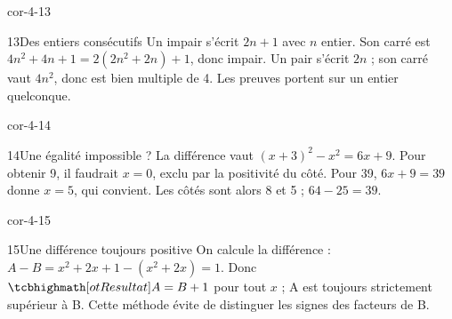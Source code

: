 \begin{blocLivre}{cor-4-13}\begin{corrige}{13}{Des entiers consécutifs}
Un impair s’écrit $2n+1$ avec $n$ entier. Son carré est $4n^2+4n+1=2(2n^2+2n)+1$, donc impair. Un pair s’écrit $2n$ ; son carré vaut $4n^2$, donc est bien multiple de 4. Les preuves portent sur un entier quelconque.
\end{corrige}\end{blocLivre}
\begin{blocLivre}{cor-4-14}\begin{corrige}{14}{Une égalité impossible ?}
La différence vaut $(x+3)^2-x^2=6x+9$. Pour obtenir 9, il faudrait $x=0$, exclu par la positivité du côté. Pour 39, $6x+9=39$ donne $x=5$, qui convient. Les côtés sont alors 8 et 5 ; $64-25=39$.
\end{corrige}\end{blocLivre}
\begin{blocLivre}{cor-4-15}\begin{corrige}{15}{Une différence toujours positive}
On calcule la différence : $A-B=x^2+2x+1-(x^2+2x)=1$. Donc $\res{A=B+1}$ pour tout $x$ ; A est toujours strictement supérieur à B. Cette méthode évite de distinguer les signes des facteurs de B.
\end{corrige}\end{blocLivre}
